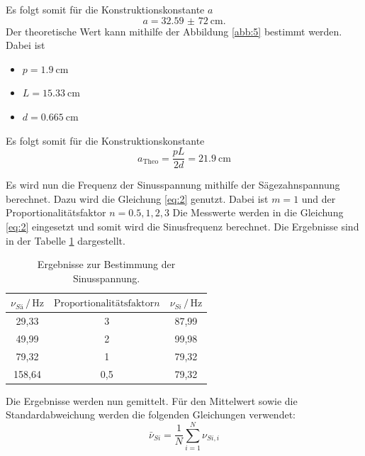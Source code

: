 Es folgt somit für die Konstruktionskonstante $a$
\begin{equation*}
  a = \SI{32,59(72)}{\centi\meter}.
\end{equation*}
Der theoretische Wert kann mithilfe der Abbildung \ref{abb:5} bestimmt werden.
Dabei ist
\begin{itemize}
  \item $p = \SI{1.9}{\centi\meter}$
  \item $L = \SI{15.33}{\centi\meter}$
  \item $d = \SI{0.665}{\centi\meter}$
\end{itemize}
Es folgt somit für die Konstruktionskonstante
\begin{equation*}
  a_{\text{Theo}} = \frac{pL}{2d} = \SI{21.9}{\centi\meter}
\end{equation*}

Es wird nun die Frequenz der Sinusspannung mithilfe der Sägezahnspannung
berechnet.
Dazu wird die Gleichung \ref{eq:2} genutzt. Dabei ist $m = 1$ und der
Proportionalitätsfaktor $n= 0.5, 1, 2, 3$
Die Messwerte werden in die Gleichung \ref{eq:2} eingesetzt und somit wird die Sinusfrequenz berechnet.
Die Ergebnisse sind in der Tabelle \ref{tab:3} dargestellt.
\begin{table}[H]
  \centering
  \caption{Ergebnisse zur Bestimmung der Sinusspannung.}
  \label{tab:3}
  \begin{tabular}{c c c}
\toprule
$\nu_{Sä} \,/\, \si{\hertz}$& $\text{Proportionalitätsfaktor} n$ & $\nu_{Si} \, /\, \si{\hertz}$\\
\midrule
29,33 & 3 & 87,99\\
49,99 & 2 & 99,98\\
79,32 & 1 & 79,32\\
158,64& 0,5& 79,32\\
\bottomrule
  \end{tabular}
\end{table}
Die Ergebnisse werden nun gemittelt.
Für den Mittelwert sowie die Standardabweichung werden die folgenden Gleichungen verwendet:
\begin{equation*}
    \bar{\nu}_{Si}= \frac{1}{N} \sum_{i=1}^{N} \nu_{Si,i}
\end{equation*}

